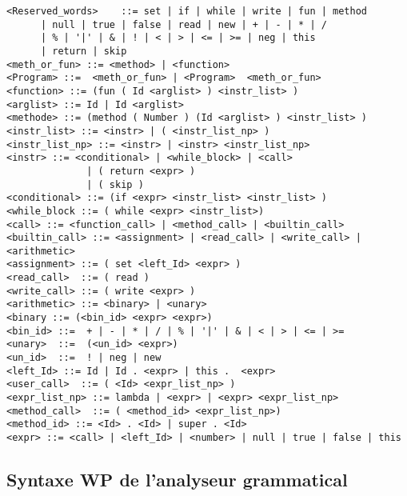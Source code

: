 \begin{verbatim}
<Reserved_words>    ::= set | if | while | write | fun | method 
      | null | true | false | read | new | + | - | * | / 
      | % | '|' | & | ! | < | > | <= | >= | neg | this 
      | return | skip
<meth_or_fun> ::= <method> | <function>
<Program> ::=  <meth_or_fun> | <Program>  <meth_or_fun>
<function> ::= (fun ( Id <arglist> ) <instr_list> ) 
<arglist> ::= Id | Id <arglist>
<methode> ::= (method ( Number ) (Id <arglist> ) <instr_list> )
<instr_list> ::= <instr> | ( <instr_list_np> ) 
<instr_list_np> ::= <instr> | <instr> <instr_list_np>
<instr> ::= <conditional> | <while_block> | <call> 
			  | ( return <expr> ) 
			  | ( skip )
<conditional> ::= (if <expr> <instr_list> <instr_list> ) 
<while_block ::= ( while <expr> <instr_list>) 
<call> ::= <function_call> | <method_call> | <builtin_call> 
<builtin_call> ::= <assignment> | <read_call> | <write_call> | <arithmetic>
<assignment> ::= ( set <left_Id> <expr> ) 
<read_call>  ::= ( read ) 
<write_call> ::= ( write <expr> )
<arithmetic> ::= <binary> | <unary>
<binary ::= (<bin_id> <expr> <expr>)
<bin_id> ::=  + | - | * | / | % | '|' | & | < | > | <= | >=
<unary>  ::=  (<un_id> <expr>)
<un_id>  ::=  ! | neg | new
<left_Id> ::= Id | Id . <expr> | this .  <expr>
<user_call>  ::= ( <Id> <expr_list_np> )
<expr_list_np> ::= lambda | <expr> | <expr> <expr_list_np>
<method_call>  ::= ( <method_id> <expr_list_np>)
<method_id> ::= <Id> . <Id> | super . <Id> 
<expr> ::= <call> | <left_Id> | <number> | null | true | false | this  
\end{verbatim}


\subsection{Syntaxe WP de l'analyseur grammatical}
